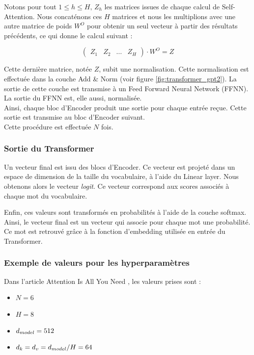 Notons pour tout $1 \leq h \leq H, \, Z_h$ les matrices issues de chaque calcul de Self-Attention. Nous concaténons
ces $H$ matrices et nous les multiplions avec une autre matrice de poids $W^O$ pour obtenir un seul vecteur à partir des résultats précédents, ce qui donne le calcul suivant :

\[  \begin{pmatrix}
    Z_1 & Z_2 & \ldots & Z_H
  \end{pmatrix}
  \cdot W^O = Z \]

Cette dernière matrice, notée $Z$, subit une normalisation. Cette normalisation est effectuée dans la
couche \og Add \& Norm \fg{} (voir figure \ref{fig:transformer_gpt2}).
La sortie de cette couche est transmise à un Feed Forward Neural Network (FFNN).
La sortie du FFNN est, elle aussi, normalisée. \\

Ainsi, chaque bloc d'Encoder produit une sortie pour chaque entrée reçue.
Cette sortie est transmise au bloc d'Encoder suivant. \\

Cette procédure est effectuée $N$ fois.


\subsubsection{Sortie du Transformer}


Un vecteur final est issu des blocs d'Encoder. Ce vecteur est projeté dans un espace de dimension de la taille du vocabulaire,
à l'aide du Linear layer. Nous obtenons alors le vecteur \textit{logit}. Ce vecteur correspond aux scores associés
à chaque mot du vocabulaire.

Enfin, ces valeurs sont transformés en probabilités à l'aide de la couche softmax. Ainsi, le vecteur final est un
vecteur qui associe pour chaque mot une probabilité. Ce mot est retrouvé grâce à la fonction d'embedding
utilisée en entrée du Transformer.


\subsubsection{Exemple de valeurs pour les hyperparamètres}

Dans l'article \og Attention Is All You Need \fg{} \cite{vaswani2017attention}, les valeurs prises sont :

\begin{itemize}
  \item $N=6$
  \item $H=8$
  \item $d_{model} = 512$
  \item $d_k = d_v = d_{model}/H = 64$
\end{itemize}


